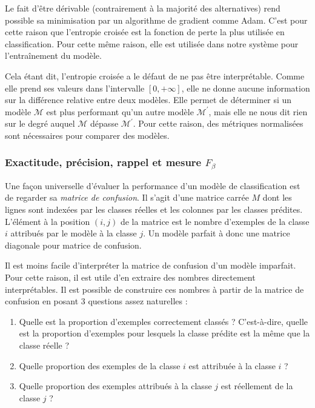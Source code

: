Le fait d'être dérivable (contrairement à la majorité des alternatives)
rend possible sa minimisation par un algorithme de gradient comme Adam.
C'est pour cette raison que l'entropie croisée est la fonction de perte la plus utilisée en classification.
Pour cette même raison, elle est utilisée dans notre système pour l'entraînement du modèle.

Cela étant dit, l'entropie croisée a le défaut de ne pas être interprétable.
Comme elle prend ses valeurs dans l'intervalle \([0, +\infty]\), 
elle ne donne aucune information sur la différence relative entre deux modèles.
Elle permet de déterminer si un modèle \(\mathcal{M}\) est plus performant qu'un autre modèle \(\mathcal{M}^\prime\),
mais elle ne nous dit rien sur le degré auquel \(\mathcal{M}\) dépasse \(\mathcal{M}^\prime\).
Pour cette raison, des métriques normalisées sont nécessaires pour comparer des modèles.

\subsubsection{Exactitude, précision, rappel et mesure \(F_\beta\)}

Une façon universelle d'évaluer la performance d'un modèle de classification 
est de regarder sa \emph{matrice de confusion}.
Il s'agit d'une matrice carrée \(M\) 
dont les lignes sont indexées par les classes réelles et les colonnes par les classes prédites.
L'élément à la position \((i, j)\) de la matrice 
est le nombre d'exemples de la classe \(i\) attribués par le modèle à la classe \(j\).
Un modèle parfait à donc une matrice diagonale pour matrice de confusion.

Il est moins facile d'interpréter la matrice de confusion d'un modèle imparfait.
Pour cette raison, il est utile d'en extraire des nombres directement interprétables.
Il est possible de construire ces nombres à partir de la matrice de confusion 
en posant 3 questions assez naturelles :
\begin{enumerate}[label=(\arabic*)]
    \item Quelle est la proportion d'exemples correctement classés ? 
    C'est-à-dire, quelle est la proportion d'exemples pour lesquels 
    la classe prédite est la même que la classe réelle ?
    \item Quelle proportion des exemples de la classe \(i\) est attribuée à la classe \(i\) ?
    \item Quelle proportion des exemples attribués à la classe \(j\) est réellement de la classe \(j\) ?
\end{enumerate}

